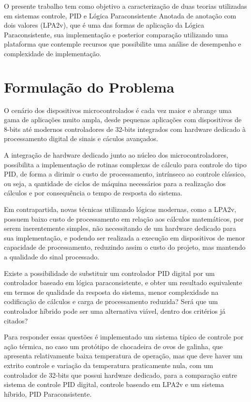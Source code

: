 \documentclass[12pt,a4paper]{report}
\begin{document}
O presente trabalho tem como objetivo a caracterização de duas teorias utilizadas em sistemas controle, PID e Lógica Paraconsistente Anotada de anotação com dois valores (LPA2v), que é uma das formas de aplicação da Lógica Paraconsistente, sua implementação e posterior comparação utilizando uma plataforma que contemple recursos que possibilite uma análise de desempenho e complexidade de implementação.


\section{Formulação do Problema}
O cenário dos dispositivos microcontrolados é cada vez maior e abrange uma gama de aplicações muito ampla, desde pequenas aplicações com dispositivos de 8-bits até modernos controladores de 32-bits integrados com hardware dedicado à processamento digital de sinais e cáculos avançados.

A integração de hardware dedicado junto ao núcleo dos microcontroladores, possibilita a implementação de rotinas complexas de cálculo para controle do tipo PID, de forma a dirimir o custo de processamento, intrínseco ao controle clássico, ou seja, a qantidade de ciclos de máquina necessários para a realização dos cálculos e por consequência o tempo de resposta do sistema. 

Em contrapartida, novas técnicas utilizando lógicas modernas, como a LPA2v, possuem baixo custo de processamento em relação aos cálculos matemáticos, por serem inerentemente simples, não necessitando de um hardware dedicado para sua implementação, e podendo ser realizada a execução em dispositivos de menor capacidade de processamento, reduzindo assim o custo do projeto, mas mantendo a qualidade do sinal processado.

Existe a possibilidade de substituir um controlador PID digital por um controlador baseado em lógica paraconsistente, e obter um resultado equivalente em termos de qualidade da resposta do sistema, menor complexidade na codificação de cálculos e carga de processamento reduzida? Será que um controlador híbrido pode ser uma alternativa viável, dentro dos critérios já citados? 

Para responder essas questões é implementado um sistema típico de controle por ação térmica, no caso um protótipo de chocadeira de ovos de galinha, que apresenta relativamente baixa temperatura de operação, mas que deve haver um extrito controle e variação da temperatura praticamente nula, com um controlador de 32-bits que possui hardware dedicado, para a comparação entre sistema de controle PID digital, controle baseado em LPA2v e um sistema híbrido, PID Paraconsistente.
\end{document}
